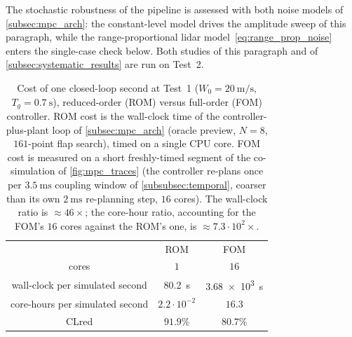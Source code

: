 The stochastic robustness of the pipeline is assessed with both noise
models of \cref{subsec:mpc_arch}: the constant-level model drives the
amplitude sweep of this paragraph, while the
range-proportional lidar model~\eqref{eq:range_prop_noise} enters the single-case check below. Both studies of this paragraph and of \cref{subsec:systematic_results} are run on Test~2.

\begin{table}[t]
\centering
\begin{tabular}{|c|c|c|}
\hhline{|-|-|-|}
\rowcolor{bluePoli!40}
 & ROM & FOM \T\B \\
\hhline{|=|=|=|}
cores & $1$ & $16$ \T\B \\
\hline
wall-clock per simulated second & \SI{80.2}{\second} & \SI{3.68e3}{\second} \T\B \\
\hline
core-hours per simulated second & $2.2\cdot10^{-2}$ & $16.3$ \T\B \\
\hline
CLred & $91.9\%$ & $80.7\%$ \B \\
\hline
\end{tabular}
\\[6pt]
\caption{Cost of one closed-loop second at Test~1 ($W_0=\SI{20}{\meter\per\second}$,
$T_g=\SI{0.7}{\second}$), reduced-order (ROM) versus
full-order (FOM) controller. ROM cost is the wall-clock time of the controller-plus-plant
loop of \cref{subsec:mpc_arch} (oracle preview, $N=8$, $161$-point flap search), timed on a
single CPU core. FOM cost is measured on a short freshly-timed segment of the co-simulation
of \cref{fig:mpc_traces} (the controller re-plans once per $\SI{3.5}{\milli\second}$
coupling window of \cref{subsubsec:temporal}, coarser than its own $\SI{2}{\milli\second}$
re-planning step, $16$ cores). The wall-clock ratio is $\approx46\times$; the
core-hour ratio, accounting for the FOM's $16$ cores against the ROM's one, is
$\approx7.3\cdot10^{2}\times$.}
\label{tab:mpc_cost_accuracy}
\end{table}

